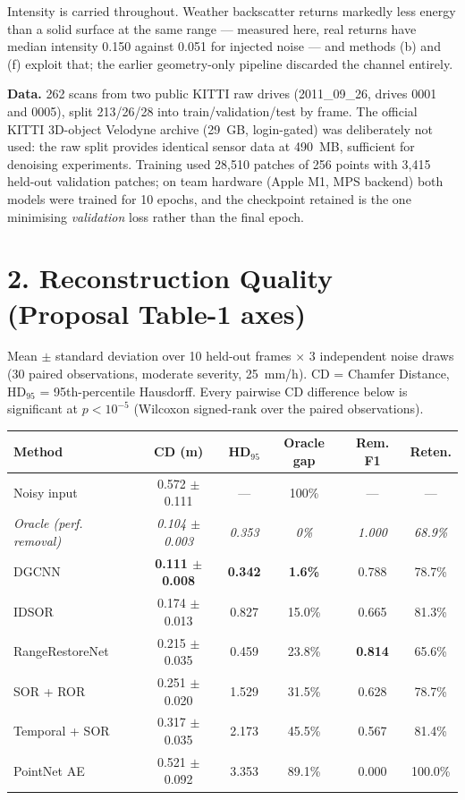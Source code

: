 \documentclass[12pt,a4paper]{article}
\begin{document}
Intensity is carried throughout. Weather backscatter returns markedly less
energy than a solid surface at the same range --- measured here, real
returns have median intensity 0.150 against 0.051 for injected noise --- and
methods (b) and (f) exploit that; the earlier geometry-only pipeline
discarded the channel entirely.

\textbf{Data.} 262 scans from two public KITTI raw drives
(2011\_09\_26, drives 0001 and 0005), split 213/26/28 into
train/validation/test by frame. The official KITTI 3D-object Velodyne
archive (29~GB, login-gated) was deliberately not used: the raw split
provides identical sensor data at 490~MB, sufficient for denoising
experiments. Training used 28{,}510 patches of 256 points with 3{,}415
held-out validation patches; on team hardware (Apple M1, MPS backend) both
models were trained for 10 epochs, and the checkpoint retained is the one
minimising \emph{validation} loss rather than the final epoch.

\section*{2. Reconstruction Quality (Proposal Table-1 axes)}

Mean $\pm$ standard deviation over 10 held-out frames $\times$ 3
independent noise draws (30 paired observations, moderate severity,
25~mm/h). CD = Chamfer Distance, HD$_{95}$ = 95th-percentile Hausdorff.
Every pairwise CD difference below is significant at $p < 10^{-5}$
(Wilcoxon signed-rank over the paired observations).

\begin{table}[h]
\centering\small
\setlength{\tabcolsep}{4pt}
\begin{tabular}{lccccc}
\toprule
\textbf{Method} & \textbf{CD (m)} & \textbf{HD$_{95}$} &
\textbf{Oracle gap} & \textbf{Rem. F1} & \textbf{Reten.}\\
\midrule
Noisy input     & 0.572 $\pm$ 0.111 & ---   & 100\%  & ---   & ---\\
\emph{Oracle (perf. removal)} & \emph{0.104 $\pm$ 0.003} & \emph{0.353} & \emph{0\%} & \emph{1.000} & \emph{68.9\%}\\
DGCNN           & \textbf{0.111 $\pm$ 0.008} & \textbf{0.342} & \textbf{1.6\%} & 0.788 & 78.7\%\\
IDSOR           & 0.174 $\pm$ 0.013 & 0.827 & 15.0\% & 0.665 & 81.3\%\\
RangeRestoreNet & 0.215 $\pm$ 0.035 & 0.459 & 23.8\% & \textbf{0.814} & 65.6\%\\
SOR + ROR       & 0.251 $\pm$ 0.020 & 1.529 & 31.5\% & 0.628 & 78.7\%\\
Temporal + SOR  & 0.317 $\pm$ 0.035 & 2.173 & 45.5\% & 0.567 & 81.4\%\\
PointNet AE     & 0.521 $\pm$ 0.092 & 3.353 & 89.1\% & 0.000 & 100.0\%\\
\bottomrule
\end{tabular}
\end{table}
\end{document}
